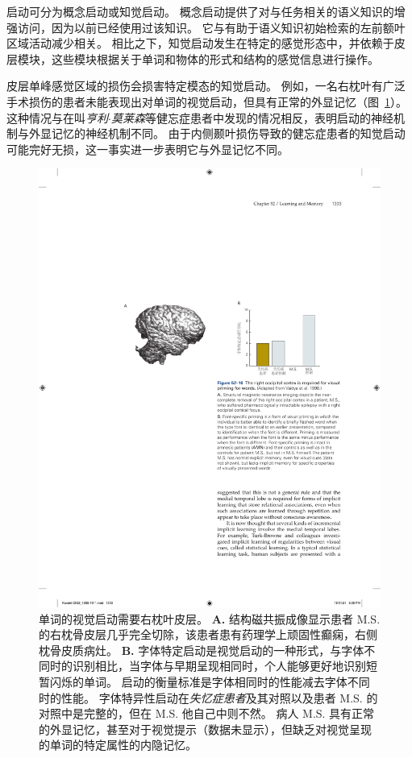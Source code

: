 启动可分为概念启动或知觉启动。
概念启动提供了对与任务相关的语义知识的增强访问，因为以前已经使用过该知识。
它与有助于语义知识初始检索的左前额叶区域活动减少相关。
相比之下，知觉启动发生在特定的感觉形态中，并依赖于皮层模块，这些模块根据关于单词和物体的形式和结构的感觉信息进行操作。


皮层单峰感觉区域的损伤会损害特定模态的知觉启动。
例如，一名右枕叶有广泛手术损伤的患者未能表现出对单词的视觉启动，但具有正常的外显记忆（图~\ref{fig:52_10}）。
这种情况与在叫\textit{亨利$\cdot$莫莱森}等健忘症患者中发现的情况相反，表明启动的神经机制与外显记忆的神经机制不同。
由于内侧颞叶损伤导致的健忘症患者的知觉启动可能完好无损，这一事实进一步表明它与外显记忆不同。


\begin{figure}[htbp]
	\centering
	\includegraphics[width=0.9\linewidth]{chap52/fig_52_10}
	\caption{单词的视觉启动需要右枕叶皮层\cite{vaidya1998font}。
		\textbf{A.} 结构磁共振成像显示患者 M.S. 的右枕骨皮层几乎完全切除，该患者患有药理学上顽固性癫痫，右侧枕骨皮质病灶。
		\textbf{B.} 字体特定启动是视觉启动的一种形式，与字体不同时的识别相比，当字体与早期呈现相同时，个人能够更好地识别短暂闪烁的单词。
		启动的衡量标准是字体相同时的性能减去字体不同时的性能。
		字体特异性启动在\textit{失忆症患者}及其对照以及患者 M.S. 的对照中是完整的，但在 M.S. 他自己中则不然。
		病人 M.S. 具有正常的外显记忆，甚至对于视觉提示（数据未显示），但缺乏对视觉呈现的单词的特定属性的内隐记忆。}
	\label{fig:52_10}
\end{figure}



